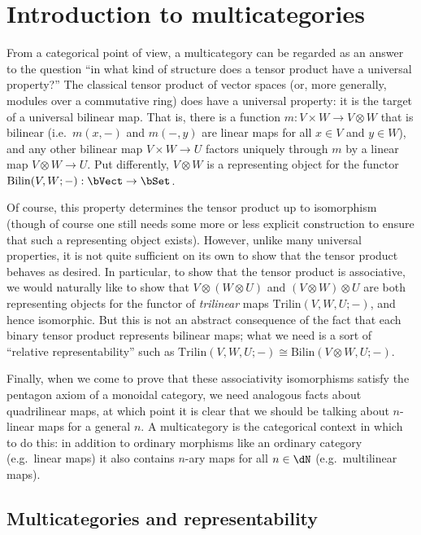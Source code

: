 \documentclass{book}
\let\tensor\otimes
\begin{document}
\section{Introduction to multicategories}
\label{sec:multicats-catth}

From a categorical point of view, a multicategory can be regarded as an answer to the question ``in what kind of structure does a tensor product have a universal property?''
The classical tensor product of vector spaces (or, more generally, modules over a commutative ring) does have a universal property: it is the target of a universal bilinear map.
That is, there is a function $m:V\times W \to V\tensor W$ that is bilinear (i.e.\ $m(x,-)$ and $m(-,y)$ are linear maps for all $x\in V$ and $y\in W$), and any other bilinear map $V\times W \to U$ factors uniquely through $m$ by a linear map $V\tensor W \to U$.
Put differently, $V\tensor W$ is a representing object for the functor $\mathrm{Bilin}(V,W;-) : \bVect \to \bSet$.

Of course, this property determines the tensor product up to isomorphism (though of course one still needs some more or less explicit construction to ensure that such a representing object exists).
However, unlike many universal properties, it is not quite sufficient on its own to show that the tensor product behaves as desired.
In particular, to show that the tensor product is associative, we would naturally like to show that $V\tensor (W\tensor U)$ and $(V\tensor W)\tensor U$ are both representing objects for the functor of \emph{trilinear} maps $\mathrm{Trilin}(V,W,U;-)$, and hence isomorphic.
But this is not an abstract consequence of the fact that each binary tensor product represents bilinear maps;
what we need is a sort of ``relative representability'' such as $\mathrm{Trilin}(V,W,U;-) \cong \mathrm{Bilin}(V\tensor W,U;-)$.

Finally, when we come to prove that these associativity isomorphisms satisfy the pentagon axiom of a monoidal category, we need analogous facts about quadrilinear maps, at which point it is clear that we should be talking about $n$-linear maps for a general $n$.
A multicategory is the categorical context in which to do this: in addition to ordinary morphisms like an ordinary category (e.g.\ linear maps) it also contains $n$-ary maps for all $n\in\dN$ (e.g.\ multilinear maps).

\subsection{Multicategories and representability}
\label{sec:multicat-repr}
\end{document}
